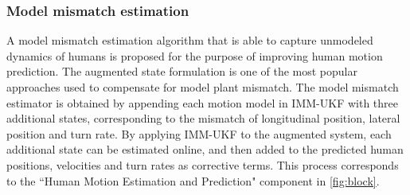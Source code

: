 \documentclass[journal]{IEEEtran}
\DeclareRobustCommand{\clnote}[1]{\ifthenelse{\boolean{include-notes}}%
{\textcolor{orange}{\textbf{CL: #1}}}{}}
\DeclareRobustCommand{\dhnote}[1]{\ifthenelse{\boolean{include-notes}}%
{\textcolor{blue}{\textbf{DH: #1}}}{}}
\begin{document}
	\subsubsection{Model mismatch estimation}\label{subsec:DOB}
    A model mismatch estimation algorithm that is able to capture unmodeled dynamics of humans is proposed for the purpose of improving human motion prediction. 
The augmented state formulation is one of the most popular approaches used to compensate for model plant mismatch\cite{EvaluationAEKF,wan2000unscented,jiang2015disturbance}.
 The model mismatch estimator is obtained by appending each motion model in IMM-UKF with three additional states, corresponding to the mismatch of longitudinal position, lateral position and turn rate.
	By applying IMM-UKF to the augmented system, each additional state can be estimated online, and then added to the predicted human positions, velocities and turn rates as corrective terms.
	This process corresponds to the ``Human Motion Estimation and Prediction" component in \cref{fig:block}.
    
\end{document}
